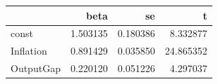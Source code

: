 \begin{tabular}{lrrr}
\toprule
 & beta & se & t \\
\midrule
const & 1.503135 & 0.180386 & 8.332877 \\
Inflation & 0.891429 & 0.035850 & 24.865352 \\
OutputGap & 0.220120 & 0.051226 & 4.297037 \\
\bottomrule
\end{tabular}
